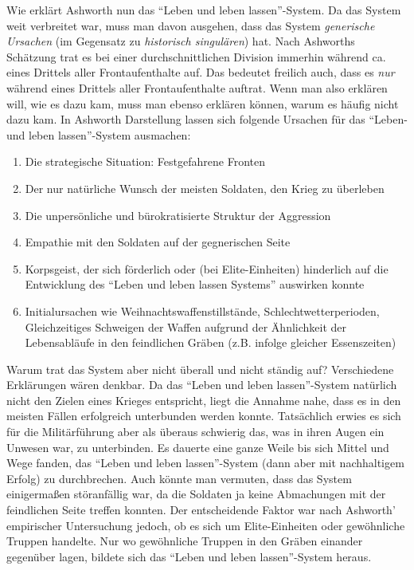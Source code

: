 \documentclass[12pt,a4paper,ngerman]{article}
\begin{document}
Wie erklärt Ashworth nun das "`Leben und leben lassen"'-System. Da das System
weit verbreitet war, muss man davon ausgehen, dass das System {\em
generische Ursachen} (im Gegensatz zu {\em historisch singulären}) hat. Nach
Ashworths Schätzung trat es bei einer durchschnittlichen Division immerhin
während ca. eines Drittels aller Frontaufenthalte auf. Das bedeutet freilich
auch, dass es {\em nur} während eines Drittels aller Frontaufenthalte auftrat.
Wenn man also erklären will, wie es dazu kam, muss man ebenso erklären können,
warum es häufig nicht dazu kam. In Ashworth Darstellung lassen sich folgende
Ursachen für das "`Leben- und leben lassen"'-System ausmachen:

\begin{enumerate}

\item Die strategische Situation: Festgefahrene Fronten

\item Der nur natürliche Wunsch der meisten Soldaten, den Krieg zu überleben

\item Die unpersönliche und bürokratisierte Struktur der Aggression
\cite[S. 76ff.]{ashworth:1980}

\item Empathie mit den Soldaten auf der gegnerischen Seite

\item Korpsgeist, der sich förderlich oder (bei Elite-Einheiten) hinderlich auf
die Entwicklung des "`Leben und leben lassen Systems"' auswirken konnte 

\item Initialursachen wie Weihnachtswaffenstillstände, 
Schlechtwetterperioden, Gleichzeitiges Schweigen der Waffen aufgrund
der Ähnlichkeit der Lebensabläufe in den feindlichen Gräben
(z.B. infolge gleicher Essenszeiten)

\end{enumerate}

Warum trat das System aber nicht überall und nicht ständig auf?
Verschiedene Erklärungen wären denkbar. Da das "`Leben und leben
lassen"'-System natürlich nicht den Zielen eines Krieges entspricht,
liegt die Annahme nahe, dass es in den meisten Fällen erfolgreich
unterbunden werden konnte.  Tatsächlich erwies es sich für die
Militärführung aber als überaus schwierig das, was in ihren Augen ein
Unwesen war, zu unterbinden. Es dauerte eine ganze Weile bis sich
Mittel und Wege fanden, das "`Leben und leben lassen"'-System (dann
aber mit nachhaltigem Erfolg) zu durchbrechen. Auch könnte man
vermuten, dass das System einigermaßen störanfällig war, da die
Soldaten ja keine Abmachungen mit der feindlichen Seite treffen
konnten. Der entscheidende Faktor war nach Ashworth' empirischer
Untersuchung jedoch, ob es sich um Elite-Einheiten oder gewöhnliche Truppen
handelte. Nur wo gewöhnliche Truppen in den Gräben einander gegenüber
lagen, bildete sich das "`Leben und leben lassen"'-System heraus.
\end{document}
